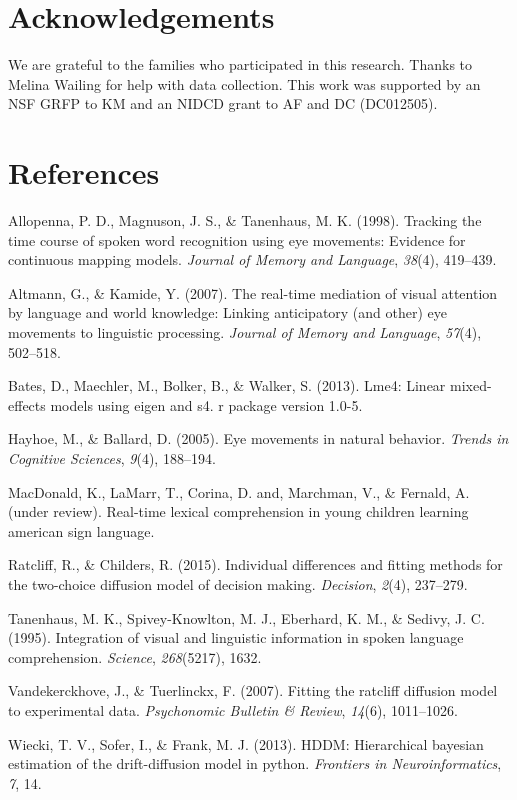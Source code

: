 \documentclass[10pt, letterpaper]{article}
\begin{document}
\section{Acknowledgements}\label{acknowledgements}

We are grateful to the families who participated in this research.
Thanks to Melina Wailing for help with data collection. This work was
supported by an NSF GRFP to KM and an NIDCD grant to AF and DC
(DC012505).

\section{References}\label{references}

\setlength{\parindent}{-0.1in} \setlength{\leftskip}{0.125in} \noindent

\hypertarget{refs}{}
\hypertarget{ref-allopenna1998tracking}{}
Allopenna, P. D., Magnuson, J. S., \& Tanenhaus, M. K. (1998). Tracking
the time course of spoken word recognition using eye movements: Evidence
for continuous mapping models. \emph{Journal of Memory and Language},
\emph{38}(4), 419--439.

\hypertarget{ref-altmann2007real}{}
Altmann, G., \& Kamide, Y. (2007). The real-time mediation of visual
attention by language and world knowledge: Linking anticipatory (and
other) eye movements to linguistic processing. \emph{Journal of Memory
and Language}, \emph{57}(4), 502--518.

\hypertarget{ref-bates2013lme4}{}
Bates, D., Maechler, M., Bolker, B., \& Walker, S. (2013). Lme4: Linear
mixed-effects models using eigen and s4. r package version 1.0-5.

\hypertarget{ref-hayhoe2005eye}{}
Hayhoe, M., \& Ballard, D. (2005). Eye movements in natural behavior.
\emph{Trends in Cognitive Sciences}, \emph{9}(4), 188--194.

\hypertarget{ref-macdonald2017realtime}{}
MacDonald, K., LaMarr, T., Corina, D. and, Marchman, V., \& Fernald, A.
(under review). Real-time lexical comprehension in young children
learning american sign language.

\hypertarget{ref-ratcliff2015individual}{}
Ratcliff, R., \& Childers, R. (2015). Individual differences and fitting
methods for the two-choice diffusion model of decision making.
\emph{Decision}, \emph{2}(4), 237--279.

\hypertarget{ref-tanenhaus1995integration}{}
Tanenhaus, M. K., Spivey-Knowlton, M. J., Eberhard, K. M., \& Sedivy, J.
C. (1995). Integration of visual and linguistic information in spoken
language comprehension. \emph{Science}, \emph{268}(5217), 1632.

\hypertarget{ref-vandekerckhove2007fitting}{}
Vandekerckhove, J., \& Tuerlinckx, F. (2007). Fitting the ratcliff
diffusion model to experimental data. \emph{Psychonomic Bulletin \&
Review}, \emph{14}(6), 1011--1026.

\hypertarget{ref-wiecki2013hddm}{}
Wiecki, T. V., Sofer, I., \& Frank, M. J. (2013). HDDM: Hierarchical
bayesian estimation of the drift-diffusion model in python.
\emph{Frontiers in Neuroinformatics}, \emph{7}, 14.
\end{document}

